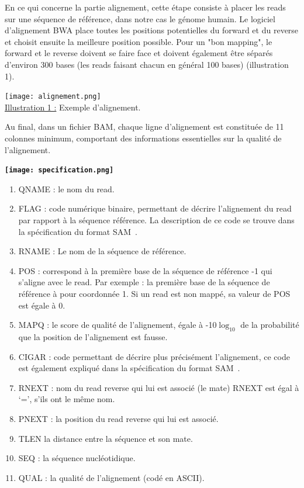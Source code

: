 \documentclass[a4paper,12pt]{article}
\begin{document}
En ce qui concerne la partie alignement, cette étape consiste à placer les reads sur une séquence de référence, dans notre cas le génome humain. Le logiciel d'alignement BWA place toutes les positions potentielles du forward et du reverse et choisit ensuite la meilleure position possible. Pour un "bon mapping", le forward et le reverse doivent se faire face et doivent également être séparés d'environ 300 bases (les reads faisant chacun en général 100 bases) (illustration 1). 
 \begin{center}
 \texttt{[image: alignement.png]}~\\
 \underline{Illustration 1 :}
 Exemple d'alignement.\\
 \end{center}
 \begin{center}
 \end{center}
 Au final, dans un fichier BAM, chaque ligne d'alignement est constituée de 11 colonnes minimum, comportant des informations essentielles sur la qualité de l'alignement.   
  \begin{center}
 \textbf{ \texttt{[image: specification.png]}~}
  \end{center}
\begin{enumerate}
\item QNAME :	le nom du read.
\item FLAG  :	code numérique binaire, permettant de décrire l'alignement du read par rapport à la séquence référence. La description de ce code se trouve dans la spécification du format SAM~\cite{SAM}.
\item RNAME :	Le nom de la séquence de référence.
\item POS	: correspond à la première base de la séquence de référence -1 qui s'aligne avec le read. Par exemple : la première base de la séquence de référence à pour coordonnée 1. Si un read est non mappé, sa valeur de POS est égale à 0.
\item MAPQ  :	le score de qualité de l'alignement, égale à -10$\log_{10}$ de la probabilité que la position de l'alignement est fausse. 
\item CIGAR :	code permettant de décrire plus précisément l'alignement, ce code est également expliqué dans la spécification du format SAM~\cite{SAM}.
\item RNEXT	: nom du read reverse qui lui est associé (le mate) RNEXT est égal à ‘=’, s'ils ont le même nom.
\item PNEXT	: la position du read reverse qui lui est associé.
\item TLEN	la distance entre la séquence et son mate.
\item SEQ	: la séquence nucléotidique.
\item QUAL : la qualité de l'alignement (codé en ASCII).
\end{enumerate}
\end{document}
